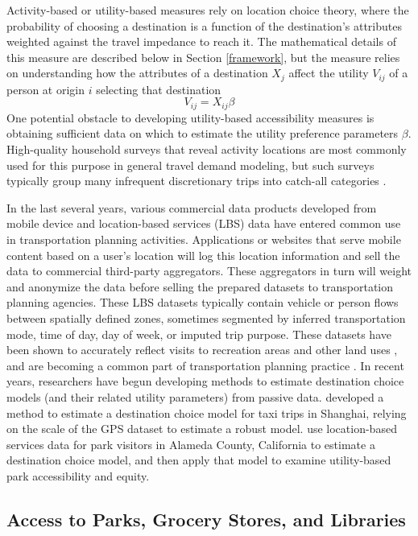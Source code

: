 \documentclass[ijerph,article,submit,moreauthors,pdftex]{mdpi}
\begin{document}
Activity-based or utility-based measures rely on location choice theory, where
the probability of choosing a destination is a function of the destination's
attributes weighted against the travel impedance to reach it. The mathematical
details of this measure are described below in Section \ref{framework}, but the
measure relies on understanding how the attributes of a destination \(X_j\) affect
the utility \(V_{ij}\) of a person at origin \(i\) selecting that destination
\begin{equation}
V_{ij} = X_{ij}\beta
  \label{eq:simple-utility}
\end{equation}
One potential obstacle to developing utility-based accessibility measures is
obtaining sufficient data on which to estimate the utility preference parameters \(\beta\).
High-quality household surveys that reveal activity locations are most commonly
used for this purpose in general travel demand modeling, but such surveys typically
group many infrequent discretionary trips into catch-all categories \citep{nchrp716}.

In the last several years, various commercial data products developed from
mobile device and location-based services (LBS) data have entered common use in
transportation planning activities. Applications or websites that serve mobile
content based on a user's location will log this location information and
sell the data to commercial third-party aggregators. These aggregators in turn will weight
and anonymize the data before selling the prepared datasets to transportation
planning agencies. These LBS datasets typically contain
vehicle or person flows between spatially defined zones, sometimes segmented by
inferred transportation mode, time of day, day of week, or imputed trip purpose.
These datasets have been shown to accurately reflect visits to recreation areas
and other land uses \citep{monz2019}, and are becoming a common part of transportation
planning practice \citep{naboulsi2016, tcrp138}. In recent years, researchers have
begun developing methods to estimate destination choice models (and their
related utility parameters) from passive data. \citet{zhu2018} developed a method to
estimate a destination choice model for taxi trips in Shanghai, relying on the
scale of the GPS dataset to estimate a robust model. \citet{alamedaparks} use
location-based services data for park visitors in Alameda County, California to
estimate a destination choice model, and then apply that model to examine
utility-based park accessibility and equity.

\hypertarget{access-to-parks-grocery-stores-and-libraries}{%
\subsection{Access to Parks, Grocery Stores, and Libraries}\label{access-to-parks-grocery-stores-and-libraries}}
\end{document}
